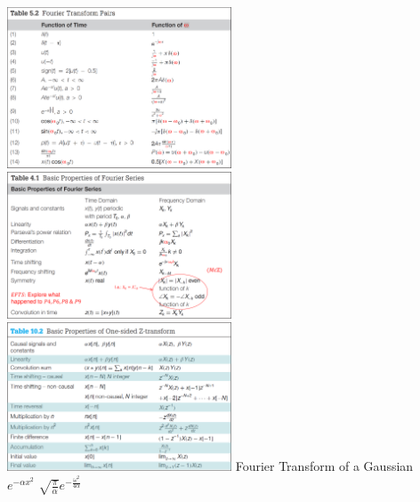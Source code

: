 \documentclass[12pt,landscape,letterpaper]{article}
\newcommand{\tab}{\hspace{0.02\textwidth}}
\begin{document}
\begin{multicols*}{2}
	\includegraphics[width=0.5\textwidth]{fourierXform-pairs}
	\includegraphics[width=0.5\textwidth]{fourierSeries-props}
	\includegraphics[width=0.5\textwidth]{zXform-props}
	\tab Fourier Transform of a Gaussian\\
	\tab $\displaystyle e^{-\alpha x^2}$ \quad $\displaystyle \sqrt{\frac{\pi}{\alpha}}e^{-\frac{\omega^2}{4\alpha}}$
\end{multicols*}
\end{document}
